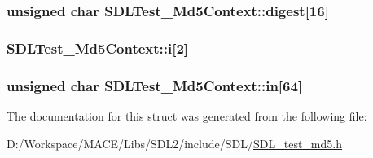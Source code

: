 \subsubsection[{\texorpdfstring{digest}{digest}}]{\setlength{\rightskip}{0pt plus 5cm}unsigned char S\+D\+L\+Test\+\_\+\+Md5\+Context\+::digest\mbox{[}16\mbox{]}}\hypertarget{struct_s_d_l_test___md5_context_ab29079997a9f35e5d52c2aac3ad28f90}{}\label{struct_s_d_l_test___md5_context_ab29079997a9f35e5d52c2aac3ad28f90}
\subsubsection[{\texorpdfstring{i}{i}}]{ S\+D\+L\+Test\+\_\+\+Md5\+Context\+::i\mbox{[}2\mbox{]}}\hypertarget{struct_s_d_l_test___md5_context_a95b3d5fd74fd1b7a27bf96f3bb32beb4}{}\label{struct_s_d_l_test___md5_context_a95b3d5fd74fd1b7a27bf96f3bb32beb4}
\subsubsection[{\texorpdfstring{in}{in}}]{\setlength{\rightskip}{0pt plus 5cm}unsigned char S\+D\+L\+Test\+\_\+\+Md5\+Context\+::in\mbox{[}64\mbox{]}}\hypertarget{struct_s_d_l_test___md5_context_a337638ef799dc0ad9397ea9b175ea388}{}\label{struct_s_d_l_test___md5_context_a337638ef799dc0ad9397ea9b175ea388}


The documentation for this struct was generated from the following file\+:\begin{DoxyCompactItemize}
\item 
D\+:/\+Workspace/\+M\+A\+C\+E/\+Libs/\+S\+D\+L2/include/\+S\+D\+L/\hyperlink{_s_d_l__test__md5_8h}{S\+D\+L\+\_\+test\+\_\+md5.\+h}\end{DoxyCompactItemize}
